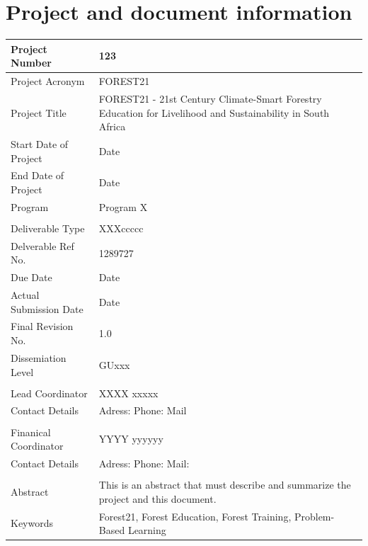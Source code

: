 \documentclass[
  11pt,
]{article}
\begin{document}
\clearpage


\hypertarget{project-and-document-information}{%
\section*{Project and document
information}\label{project-and-document-information}}

\begingroup\fontsize{11}{13}\selectfont

\begin{tabu} to 
\hline
Project Number & 123\\
\hline
Project Acronym & FOREST21\\
\hline
Project Title & FOREST21 - 21st Century Climate-Smart Forestry Education for Livelihood and Sustainability in South                                  Africa\\
\hline
Start Date of Project & Date\\
\hline
End Date of Project & Date\\
\hline
Program & Program X\\
\hline
 & \\
\hline
Deliverable Type & XXXccccc\\
\hline
Delverable Ref No. & 1289727\\
\hline
Due Date & Date\\
\hline
Actual Submission Date & Date\\
\hline
Final Revision No. & 1.0\\
\hline
Dissemiation Level & GUxxx\\
\hline
 & \\
\hline
Lead Coordinator & XXXX xxxxx\\
\hline
Contact Details & Adress: 
 Phone: 
 Mail\\
\hline
 & \\
\hline
Finanical Coordinator & YYYY yyyyyy\\
\hline
Contact Details & Adress: 
 Phone: 
 Mail:\\
\hline
 & \\
\hline
Abstract & This is an abstract that must describe and summarize the project and this document.\\
\hline
Keywords & Forest21, Forest Education, Forest Training, Problem-Based Learning\\
\hline
\end{tabu}
\endgroup{}
\end{document}
